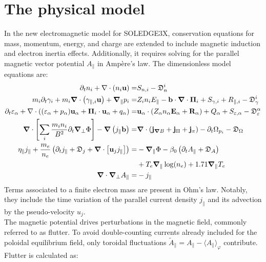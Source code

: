 \chapter{The physical model}
\label{chap:SOLEDGE3X_framework}

\vfill
\begin{chaptersummarybox}
	In the new electromagnetic model for SOLEDGE3X, conservation equations for mass, momentum, energy, and charge are extended to include magnetic induction and electron inertia effects. Additionally, it requires solving for the parallel magnetic vector potential $A_\parallel$ in Ampère's law. The dimensionless model equations are:
	\begin{align*}
		\partial_t n_i + \nabla\cdot\left(n_i\mathbf{u}\right) =& S_{n,i} - \mathfrak{D}_n^i \\
		m_i\partial_t \gamma_{i} + m_i\grad\cdot\left(\gamma_{\parallel,i}\mathbf{u}\right) + \grad_\parallel{p_i} =& Z_in_iE_\parallel - \mathbf{b}\cdot\grad\cdot\boldsymbol{\Pi}_i + S_{\gamma,i} + R_{\parallel,i} - \mathfrak{D}_\gamma^i \\
		\partial_t \varepsilon_\alpha + \nabla \cdot \left( (\varepsilon_\alpha + p_\alpha)\mathbf{u}_\alpha + \boldsymbol{\Pi}_i\cdot\mathbf{u}_\alpha + q_\alpha \right) =& \mathbf{u}_\alpha \cdot \left(Z_\alpha n_\alpha\mathbf{E}_\alpha + \mathbf{R}_\alpha \right) + Q_\alpha + S_{\varepsilon,\alpha} - \mathfrak{D}_\varepsilon^\alpha \\
		\grad\cdot\left[\sum_{i}\frac{m_i n_i}{ B^2}\partial_t\grad_\perp\Phi\right] - \grad\left(j_\parallel \textbf{b}\right) =& \grad\cdot\left(\mathbf{j}_{\grad B} + \mathbf{j}_{\Pi} + \mathbf{j}_{\pi}\right) - \partial_t \Omega_{p_i}  - \mathfrak{D}_\Omega \\
		\eta_\parallel j_\parallel + \frac{m_e}{n_e}\left(\partial_t j_\parallel + \mathfrak{D}_j + \grad\cdot\left[\textbf{u}_j j_\parallel \right]\right) =& -\grad_\parallel\Phi - \beta_0 \left(\partial_tA_\parallel + \mathfrak{D}_A\right) \\ 
		&+ T_e\grad_\parallel\log(n_e) + 1.71\grad_\parallel T_e \\
		\grad\cdot\grad_\perp A_\parallel =& -j_\parallel
	\end{align*}
	Terms associated to a finite electron mass are present in Ohm's law. Notably, they include the time variation of the parallel current density $j_\parallel$ and its advection by the pseudo-velocity $u_j$. \\
	The magnetic potential drives perturbations in the magnetic field, commonly referred to as flutter. To avoid double-counting currents already included for the poloidal equilibrium field, only toroidal fluctuations $\tilde{A}_\parallel = A_\parallel - \langle A_\parallel\rangle_\varphi$ contribute. Flutter is calculated as:

\end{chaptersummarybox}
